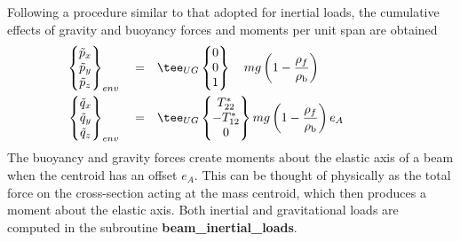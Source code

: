 Following a procedure similar to that adopted for inertial loads, the cumulative effects of gravity and buoyancy forces and moments per unit span are obtained 
\begin{align}
\begin{Bmatrix} \tilde{p}_x \\ \tilde{p}_y \\ \tilde{p}_z \end{Bmatrix}_{env} \quad = \quad &\tee_{UG} \begin{Bmatrix} 0 \\ 0 \\ 1\end{Bmatrix} \quad m g \left(1 - \frac{\rho_f}{\rho_\textrm{b}}\right) \qquad \qquad\\ 
\begin{Bmatrix} \tilde{q}_x \\ \tilde{q}_y \\ \tilde{q}_z \end{Bmatrix}_{env} \quad = \quad &\tee_{UG} \begin{Bmatrix} T_{22}^* \\ -T_{12}^* \\ 0 \end{Bmatrix} m g \left(1 - \frac{\rho_f}{\rho_\textrm{b}} \right) e_A \qquad \qquad
\end{align}
The buoyancy and gravity forces create moments about the elastic axis of a beam when the centroid has an offset $e_A$. This can be thought of physically as the total force on the cross-section acting at the mass centroid, which then produces a moment about the elastic axis. Both inertial and gravitational loads are computed in the subroutine \textbf{beam\_inertial\_loads}.

